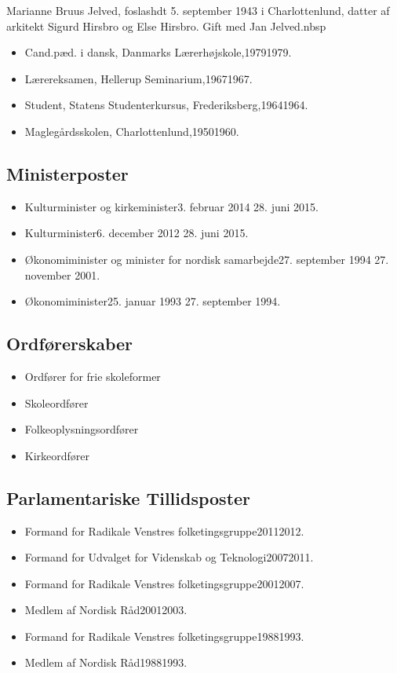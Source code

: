 \documentclass[11pt, a4paper]{awesome-cv}
\begin{document}
\makecvheader[R]
\makelettertitle
\begin{cvletter}
Marianne Bruus Jelved, foslashdt 5. september 1943 i Charlottenlund, datter af arkitekt Sigurd Hirsbro og Else Hirsbro. Gift med Jan Jelved.nbsp

\begin{itemize}
\item Cand.pæd. i dansk, Danmarks Lærerhøjskole,19791979.
\item Lærereksamen, Hellerup Seminarium,19671967.
\item Student, Statens Studenterkursus, Frederiksberg,19641964.
\item Maglegårdsskolen, Charlottenlund,19501960.
\end{itemize}
\subsection*{Ministerposter}
\begin{itemize}
\item Kulturminister og kirkeminister3. februar 2014  28. juni 2015.
\item Kulturminister6. december 2012  28. juni 2015.
\item Økonomiminister og minister for nordisk samarbejde27. september 1994  27. november 2001.
\item Økonomiminister25. januar 1993  27. september 1994.
\end{itemize}
\subsection*{Ordførerskaber}
\begin{itemize}
\item Ordfører for frie skoleformer
\item Skoleordfører
\item Folkeoplysningsordfører
\item Kirkeordfører
\end{itemize}
\subsection*{Parlamentariske Tillidsposter}
\begin{itemize}
\item Formand for Radikale Venstres folketingsgruppe20112012.
\item Formand for Udvalget for Videnskab og Teknologi20072011.
\item Formand for Radikale Venstres folketingsgruppe20012007.
\item Medlem af Nordisk Råd20012003.
\item Formand for Radikale Venstres folketingsgruppe19881993.
\item Medlem af Nordisk Råd19881993.
\end{itemize}

\end{cvletter}
\end{document}
